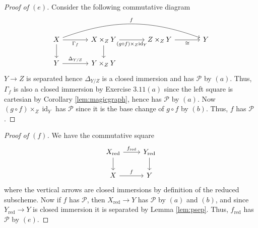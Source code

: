 \documentclass[10pt]{article}
\theoremstyle{definition}
\theoremstyle{remark}
\numberwithin{equation}{section}
\numberwithin{figure}{subsubsection}
\DeclareMathOperator{\id}{id}
\newcommand{\red}{\mathrm{red}}
\begin{document}
\begin{proof}[Proof of $(e)$]
  Consider the following commutative diagram
  \begin{equation*}
    \begin{tikzcd}[column sep=large]
      X \rar[swap]{\Gamma_f}\dar\arrow[bend left=20]{rrr}{f} &
      X \times_Z Y \rar[swap]{(g \circ f) \times_Z \id_Y} \dar &
      Z \times_Z Y \rar[swap]{\cong} & Y\\
      Y \rar{\Delta_{Y/Z}} & Y \times_Z Y
    \end{tikzcd}
  \end{equation*}
  $Y \to Z$ is separated hence $\Delta_{Y/Z}$ is a closed immersion and has
  $\mathscr{P}$ by $(a)$. Thus, $\Gamma_f$ is also a closed immersion by
  Exercise $3.11(a)$ since the left square is cartesian by Corollary
  \ref{lem:magicgraph}, hence has $\mathscr{P}$ by $(a)$. Now $(g \circ f)
  \times_Z \id_Y$ has $\mathscr{P}$ since it is the base change of $g \circ f$
  by $(b)$. Thus, $f$ has $\mathscr{P}$.
\end{proof}
\begin{proof}[Proof of $(f)$]
  We have the commutative square
  \begin{equation*}
    \begin{tikzcd}
      X_\red \rar{f_\red}\dar & Y_\red\dar\\
      X \rar{f} & Y
    \end{tikzcd}
  \end{equation*}
  where the vertical arrows are closed immersions by definition of the reduced
  subscheme. Now if $f$ has $\mathscr{P}$, then $X_\red \to Y$ has
  $\mathscr{P}$ by $(a)$ and $(b)$, and since $Y_\red \to Y$ is closed immersion
  it is separated by Lemma \ref{lem:psep}. Thus, $f_\red$ has $\mathscr{P}$ by
  $(e)$.
\end{proof}
\end{document}

